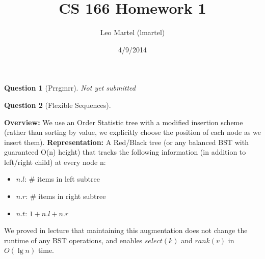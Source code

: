\documentclass{article}
\title{CS 166 Homework 1}
\author{Leo Martel (lmartel)}
\date{4/9/2014}
\newtheorem{ques}{Question}
\renewcommand{\b}[1]{\textbf{#1}}
\begin{document}
\maketitle

\begin{ques}[Prrgmrr] 
Not yet submitted
\end{ques}

\begin{ques}[Flexible Sequences] %
\end{ques}
\b{Overview:} We use an Order Statistic tree with a modified insertion scheme (rather than sorting by value, we explicitly choose the position of each node as we insert them).
\b{Representation:} A Red/Black tree (or any balanced BST with guaranteed O(\lg n) height) that tracks the following information (in addition to left/right child) at every node n:
\begin{itemize}
  \item $n.l$: # items in left subtree
  \item $n.r$: # items in right subtree
  \item $n.t$: $1 + n.l + n.r$
\end{itemize}
We proved in lecture that maintaining this augmentation does not change the runtime of any BST operations, and enables $select(k)$ and $rank(v)$ in $O(\lg n)$ time.
\end{document}
